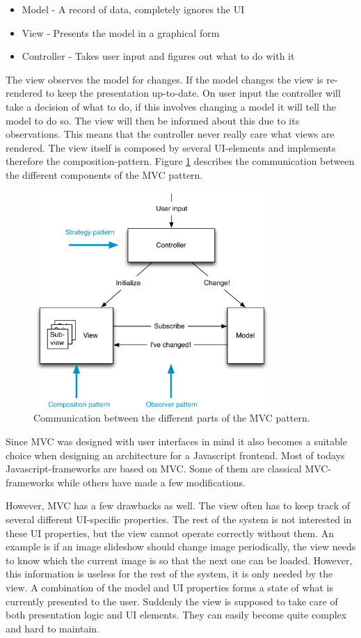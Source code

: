 \begin{itemize}
	\item Model - A record of data, completely ignores the UI
	\item View - Presents the model in a graphical form
	\item Controller - Takes user input and figures out what to do with it
\end{itemize}

The view observes the model for changes. If the model changes the view is re-rendered to keep the presentation up-to-date. On user input the controller will take a decision of what to do, if this involves changing a model it will tell the model to do so. The view will then be informed about this due to its observations. This means that the controller never really care what views are rendered. The view itself is composed by several UI-elements and implements therefore the composition-pattern. Figure \ref{fig:mvc} describes the communication between the different components of the MVC pattern.

\begin{figure}[h!]
	\centerline{\includegraphics[width=90mm]{gfx/mvc.png}}
	\caption{Communication between the different parts of the MVC pattern.}
	\label{fig:mvc}
\end{figure}

Since MVC was designed with user interfaces in mind it also becomes a suitable choice when designing an architecture for a Javascript frontend. Most of todays Javascript-frameworks are based on MVC. Some of them are classical MVC-frameworks while others have made a few modifications.

However, MVC has a few drawbacks as well. The view often has to keep track of several different UI-specific properties. The rest of the system is not interested in these UI properties, but the view cannot operate correctly without them. An example is if an image slideshow should change image periodically, the view needs to know which the current image is so that the next one can be loaded. However, this information is useless for the rest of the system, it is only needed by the view. A combination of the model and UI properties forms a state of what is currently presented to the user. Suddenly the view is supposed to take care of both presentation logic and UI elements. They can easily become quite complex and hard to maintain. 

